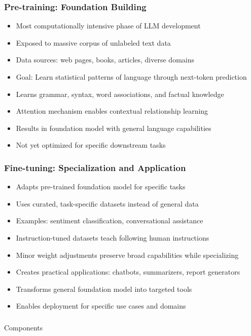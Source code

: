 \begin{frame}[fragile]\frametitle{Pre-training: Foundation Building}
      \begin{itemize}
	  \item Most computationally intensive phase of LLM development
	  \item Exposed to massive corpus of unlabeled text data
	  \item Data sources: web pages, books, articles, diverse domains
	  \item Goal: Learn statistical patterns of language through next-token prediction
	  \item Learns grammar, syntax, word associations, and factual knowledge
	  \item Attention mechanism enables contextual relationship learning
	  \item Results in foundation model with general language capabilities
	  \item Not yet optimized for specific downstream tasks
	  \end{itemize}
\end{frame}

\begin{frame}[fragile]\frametitle{Fine-tuning: Specialization and Application}
      \begin{itemize}
	  \item Adapts pre-trained foundation model for specific tasks
	  \item Uses curated, task-specific datasets instead of general data
	  \item Examples: sentiment classification, conversational assistance
	  \item Instruction-tuned datasets teach following human instructions
	  \item Minor weight adjustments preserve broad capabilities while specializing
	  \item Creates practical applications: chatbots, summarizers, report generators
	  \item Transforms general foundation model into targeted tools
	  \item Enables deployment for specific use cases and domains
	  \end{itemize}
\end{frame}

\begin{frame}[fragile]\frametitle{}
\begin{center}
{\Large Components}
\end{center}
\end{frame}

